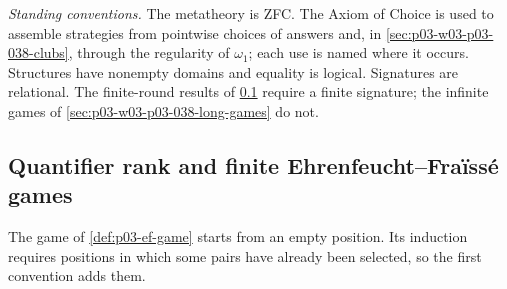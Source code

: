 \emph{Standing conventions.} The metatheory is ZFC. The Axiom of Choice
is used to assemble strategies from pointwise choices of answers and, in
\cref{sec:p03-w03-p03-038-clubs}, through the regularity of \(\omega_1\);
each use is named where it occurs. Structures have nonempty domains and
equality is logical. Signatures are relational. The finite-round results
of \cref{sec:p03-w03-p03-038-finite-games} require a finite signature;
the infinite games of \cref{sec:p03-w03-p03-038-long-games} do not.

\subsection{Quantifier rank and finite Ehrenfeucht--Fra\"iss\'e games}
\label{sec:p03-w03-p03-038-finite-games}

The game of \cref{def:p03-ef-game} starts from an empty position. Its
induction requires positions in which some pairs have already been
selected, so the first convention adds them.

